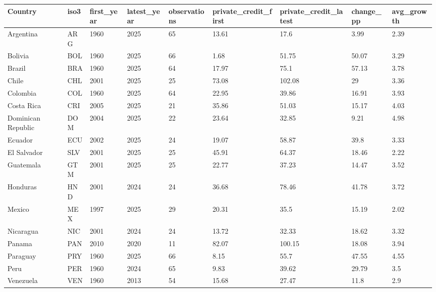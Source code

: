 ﻿%
\begin{tabular}{lllllllll}
\hline
Country & iso3 & first_year & latest_year & observations & private_credit_first & private_credit_latest & change_pp & avg_growth \\
\hline
Argentina & ARG & 1960 & 2025 & 65 & 13.61 & 17.6 & 3.99 & 2.39 \\
Bolivia & BOL & 1960 & 2025 & 66 & 1.68 & 51.75 & 50.07 & 3.29 \\
Brazil & BRA & 1960 & 2025 & 64 & 17.97 & 75.1 & 57.13 & 3.78 \\
Chile & CHL & 2001 & 2025 & 25 & 73.08 & 102.08 & 29 & 3.36 \\
Colombia & COL & 1960 & 2025 & 64 & 22.95 & 39.86 & 16.91 & 3.93 \\
Costa Rica & CRI & 2005 & 2025 & 21 & 35.86 & 51.03 & 15.17 & 4.03 \\
Dominican Republic & DOM & 2004 & 2025 & 22 & 23.64 & 32.85 & 9.21 & 4.98 \\
Ecuador & ECU & 2002 & 2025 & 24 & 19.07 & 58.87 & 39.8 & 3.33 \\
El Salvador & SLV & 2001 & 2025 & 25 & 45.91 & 64.37 & 18.46 & 2.22 \\
Guatemala & GTM & 2001 & 2025 & 25 & 22.77 & 37.23 & 14.47 & 3.52 \\
Honduras & HND & 2001 & 2024 & 24 & 36.68 & 78.46 & 41.78 & 3.72 \\
Mexico & MEX & 1997 & 2025 & 29 & 20.31 & 35.5 & 15.19 & 2.02 \\
Nicaragua & NIC & 2001 & 2024 & 24 & 13.72 & 32.33 & 18.62 & 3.32 \\
Panama & PAN & 2010 & 2020 & 11 & 82.07 & 100.15 & 18.08 & 3.94 \\
Paraguay & PRY & 1960 & 2025 & 66 & 8.15 & 55.7 & 47.55 & 4.55 \\
Peru & PER & 1960 & 2024 & 65 & 9.83 & 39.62 & 29.79 & 3.5 \\
Venezuela & VEN & 1960 & 2013 & 54 & 15.68 & 27.47 & 11.8 & 2.9 \\
\hline
\end{tabular}

